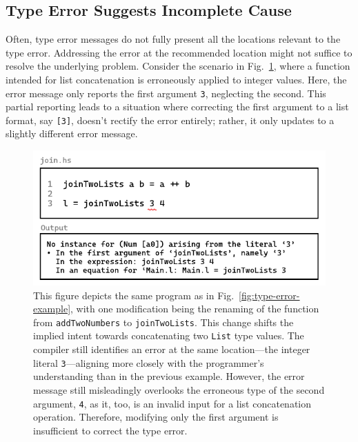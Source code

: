 \subsection*{Type Error Suggests Incomplete Cause}
\label{subsec:imcomplete}

Often, type error messages do not fully present all the locations relevant to the type error. Addressing the error at the recommended location might not suffice to resolve the underlying problem. Consider the scenario in Fig.~\ref{fig:type-error-example-2}, where a function intended for list concatenation is erroneously applied to integer values. Here, the error message only reports the first argument \texttt{3}, neglecting the second. This partial reporting leads to a situation where correcting the first argument to a list format, say \texttt{[3]}, doesn't rectify the error entirely; rather, it only updates to a slightly different error message. 



\begin{figure}[htbp]
    \centering
    \includegraphics[width=\linewidth]{TypeErrorExample2}
  \caption[Illustrating a programming error in Haskell, featuring a function named \texttt{joinTwoLists} with a type error and the corresponding compiler output]{
    \label{fig:type-error-example-2}
    This figure depicts the same program as in Fig.~\ref{fig:type-error-example}, with one modification being the renaming of the function from \texttt{addTwoNumbers} to \texttt{joinTwoLists}. This change shifts the implied intent towards concatenating two \texttt{List} type values. The compiler still identifies an error at the same location—the integer literal \texttt{3}—aligning more closely with the programmer's understanding than in the previous example. However, the error message still misleadingly overlooks the erroneous type of the second argument, \texttt{4}, as it, too, is an invalid input for a list concatenation operation. Therefore, modifying only the first argument is insufficient to correct the type error.
    }
\end{figure}

